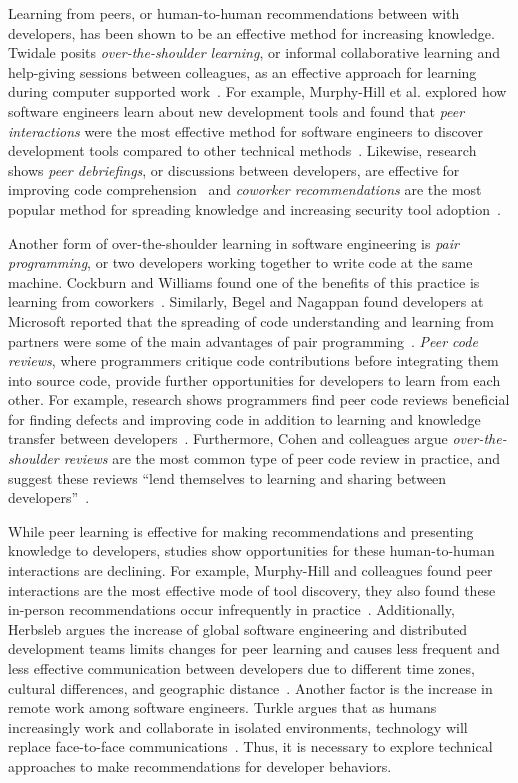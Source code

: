 Learning from peers, or human-to-human recommendations between with developers, has been shown to be an effective method for increasing knowledge. Twidale posits \textit{over-the-shoulder learning}, or informal collaborative learning and help-giving sessions between colleagues, as an effective approach for learning during computer supported work~\cite{twidale2005over}. For example, Murphy-Hill et al. explored how software engineers learn about new development tools and found that \textit{peer interactions} were the most effective method for software engineers to discover development tools compared to other technical methods~\cite{Murphy-Hill2015HowDoUsers}. Likewise, research shows \textit{peer debriefings}, or discussions between developers, are effective for improving code comprehension~\cite{Maalej2014CodeComprehension} and \textit{coworker recommendations} are the most popular method for spreading knowledge and increasing security tool adoption~\cite{Xiao2014Security}. 

Another form of over-the-shoulder learning in software engineering is \textit{pair programming}, or two developers working together to write code at the same machine. Cockburn and Williams found one of the benefits of this practice is learning from coworkers~\cite{Cockburn01Pair}. Similarly, Begel and Nagappan found developers at Microsoft reported that the spreading of code understanding and learning from partners were some of the main advantages of pair programming~\cite{begel08pair}. \textit{Peer code reviews}, where programmers critique code contributions before integrating them into source code, provide further opportunities for developers to learn from each other. For example, research shows programmers find peer code reviews beneficial for finding defects and improving code in addition to learning and knowledge transfer between developers~\cite{bacchelli2013expectations}. Furthermore, Cohen and colleagues argue \textit{over-the-shoulder reviews} are the most common type of peer code review in practice, and suggest these reviews ``lend themselves to learning and sharing between developers''~\citep[p.~27]{cohen2006best}.

While peer learning is effective for making recommendations and presenting knowledge to developers, studies show opportunities for these human-to-human interactions are declining. For example, Murphy-Hill and colleagues found peer interactions are the most effective mode of tool discovery, they also found these in-person recommendations occur infrequently in practice~\cite{Murphy-Hill2011PeerInteraction}. Additionally, Herbsleb argues the increase of global software engineering and distributed development teams limits changes for peer learning and causes less frequent and less effective communication between developers due to different time zones, cultural differences, and geographic distance~\cite{herbsleb2007global}. Another factor is the increase in remote work among software engineers. Turkle argues that as humans increasingly work and collaborate in isolated environments, technology will replace face-to-face communications~\cite{turkle2017alone}. Thus, it is necessary to explore technical approaches to make recommendations for developer behaviors.

